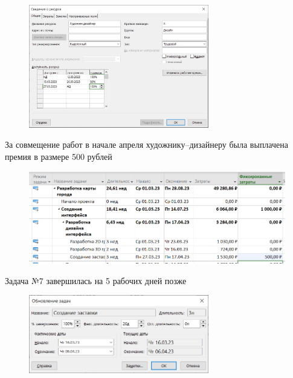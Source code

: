 \begin{figure}[H]
	\begin{center}
		\includegraphics[width=0.7\textwidth]{imgs/task_1_3.png}
	\end{center}
\end{figure}

За совмещение работ в начале апреля художнику–дизайнеру была выплачена премия в размере 500 рублей

\begin{figure}[H]
	\begin{center}
		\includegraphics[width=\textwidth]{imgs/task_1_4.png}
	\end{center}
\end{figure}

Задача №7 завершилась на 5 рабочих дней позже

\begin{figure}[H]
	\begin{center}
		\includegraphics[width=0.7\textwidth]{imgs/task_1_5.png}
	\end{center}
\end{figure}

